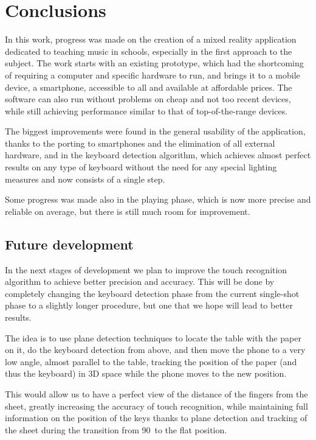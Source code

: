 \chapter{Conclusions}\label{ch:conclusions}
In this work, progress was made on the creation of a mixed reality application dedicated to
teaching music in schools, especially in the first approach to the subject.
The work starts with an existing prototype, which had the shortcoming of requiring a computer and specific hardware
to run, and brings it to a mobile device, a smartphone, accessible to all and available at affordable prices.
The software can also run without problems on cheap and not too recent devices,
while still achieving performance similar to that of top-of-the-range devices.

The biggest improvements were found in the general usability of the application, thanks to the porting to smartphones
and the elimination of all external hardware, and in the keyboard detection algorithm,
which achieves almost perfect results on any type of keyboard without the need for any special lighting measures
and now consists of a single step.

Some progress was made also in the playing phase, which is now more precise and reliable on average,
but there is still much room for improvement.


\section{Future development}\label{sec:future-development}
In the next stages of development we plan to improve the touch recognition algorithm
to achieve better precision and accuracy.
This will be done by completely changing the keyboard detection phase from the current single-shot phase to a slightly
longer procedure, but one that we hope will lead to better results.

The idea is to use plane detection techniques to locate the table with the paper on it, do the keyboard detection
from above, and then move the phone to a very low angle, almost parallel to the table, tracking the position of the
paper (and thus the keyboard) in 3D space while the phone moves to the new position.

This would allow us to have a perfect view of the distance of the fingers from the sheet, greatly increasing the
accuracy of touch recognition, while maintaining full information on the position of the keys thanks to plane
detection and tracking of the sheet during the transition from 90\degree \ to the flat position.

